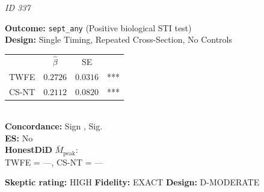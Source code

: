 \begin{tcolorbox}[
  colback=white, colframe=black!60, boxrule=0.4pt,
  arc=2pt, left=4pt, right=4pt, top=3pt, bottom=3pt]
  \footnotesize
  \textbf{\textcite{cameron2021crimes}} \hfill \textit{ID 337}\\[2pt]
  
  \begin{minipage}[t]{0.45\textwidth}
    \textbf{Outcome:} \texttt{sept\_any} (Positive biological STI test)\\
    \textbf{Design:} Single Timing, Repeated Cross-Section, No Controls\\
  \end{minipage}\hfill
  \begin{minipage}[t]{0.45\textwidth}
    \begin{tabular}{@{}lccc@{}}
      & $\hat{\beta}$ & SE & \\
      TWFE & $0.2726$ & $0.0316$ & *** \\
      CS-NT & $0.2112$ & $0.0820$ & *** \\
    \end{tabular}\\[3pt]
    \textbf{Concordance:} Sign \checkmark, Sig. \checkmark\\
    \textbf{ES:} No\\
    \textbf{HonestDiD} $\bar{M}_{\text{peak}}$:\\
    TWFE = ---, CS-NT = ---
  \end{minipage}
  \tcbline
  \textbf{Skeptic rating:} HIGH \hfill \textbf{Fidelity:} EXACT \hfill \textbf{Design:} D-MODERATE
\end{tcolorbox}
\vspace{6pt}

